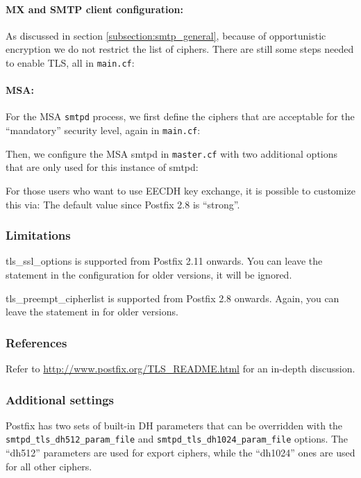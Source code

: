 \paragraph{MX and SMTP client configuration:}
As discussed in section \ref{subsection:smtp_general}, because of opportunistic encryption we do not
restrict the list of ciphers. There are still some steps needed to
enable TLS, all in \verb|main.cf|:


\paragraph{MSA:}
For the MSA \verb|smtpd| process, we first define the ciphers that are
acceptable for the ``mandatory'' security level, again in
\verb|main.cf|:


Then, we configure the MSA smtpd in \verb|master.cf| with two
additional options that are only used for this instance of smtpd:


For those users who want to use EECDH key exchange, it is possible to customize this via:
The default value since Postfix 2.8 is ``strong''.


\subsubsection{Limitations}
tls\_ssl\_options is supported from Postfix 2.11 onwards. You can
leave the statement in the configuration for older versions, it will
be ignored.

tls\_preempt\_cipherlist is supported from Postfix 2.8 onwards. Again,
you can leave the statement in for older versions.

\subsubsection{References}
Refer to \url{http://www.postfix.org/TLS_README.html} for an in-depth
discussion.

\subsubsection{Additional settings}
Postfix has two sets of built-in DH parameters that can be overridden
with the \verb|smtpd_tls_dh512_param_file|
and \verb|smtpd_tls_dh1024_param_file| options. The ``dh512''
parameters are used for export ciphers, while the ``dh1024'' ones are
used for all other ciphers.

